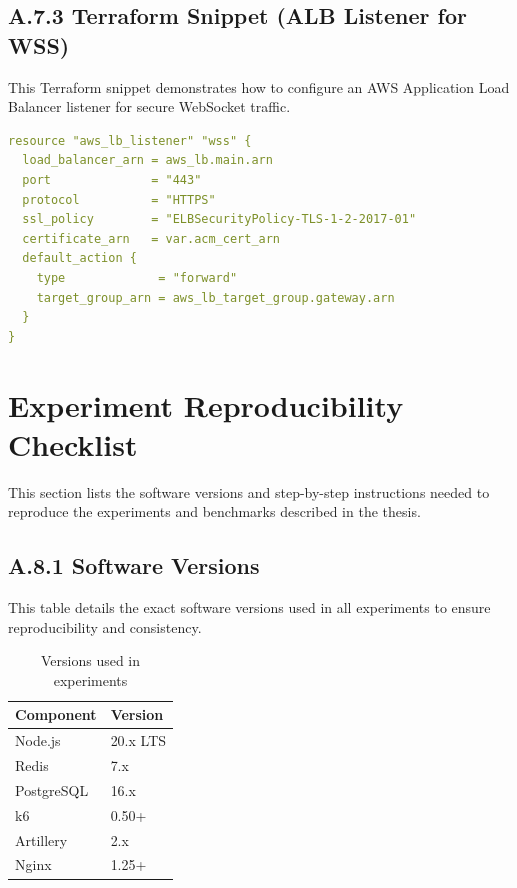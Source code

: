 \subsection*{A.7.3 Terraform Snippet (ALB Listener for WSS)}
This Terraform snippet demonstrates how to configure an AWS Application Load Balancer listener for secure WebSocket traffic.
\begin{lstlisting}[language=yaml, caption={Terraform (HCL) snippet for ALB listener (pseudo)}]
resource "aws_lb_listener" "wss" {
  load_balancer_arn = aws_lb.main.arn
  port              = "443"
  protocol          = "HTTPS"
  ssl_policy        = "ELBSecurityPolicy-TLS-1-2-2017-01"
  certificate_arn   = var.acm_cert_arn
  default_action {
    type             = "forward"
    target_group_arn = aws_lb_target_group.gateway.arn
  }
}
\end{lstlisting}


\section{Experiment Reproducibility Checklist}
This section lists the software versions and step-by-step instructions needed to reproduce the experiments and benchmarks described in the thesis.
\label{app:repro}

\subsection*{A.8.1 Software Versions}
This table details the exact software versions used in all experiments to ensure reproducibility and consistency.
\begin{table}[h]
\centering
\caption{Versions used in experiments}
\label{tab:versions}
\begin{tabular}{l l}
\toprule
\textbf{Component} & \textbf{Version} \\
\midrule
Node.js & 20.x LTS \\
Redis & 7.x \\
PostgreSQL & 16.x \\
k6 & 0.50+ \\
Artillery & 2.x \\
Nginx & 1.25+ \\
\bottomrule
\end{tabular}
\end{table}

